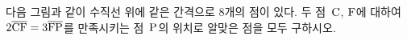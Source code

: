 다음 그림과 같이 수직선 위에 같은 간격으로 $8$개의 점이 있다. 두 점~$\mathrm{C}$, $\mathrm{F}$에 대하여 $2\overline{\mathrm{CF}}=3\overline{\mathrm{FP}}$를 만족시키는 점~$\mathrm{P}$의 위치로 알맞은 점을 모두 구하시오.
\par\smallskip\begin{center}\resizebox{\ifdim\width>\linewidth\linewidth\else\width\fi}{!}{}\end{center}
